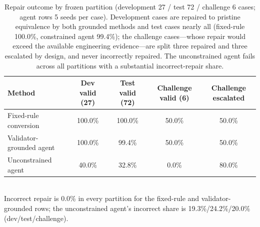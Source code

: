 \begin{table}[H]
\centering
\caption{Repair outcome by frozen partition (development 27 / test 72 /
challenge 6 cases; agent rows 5 seeds per case). Development cases are
repaired to pristine equivalence by both grounded methods and test cases
nearly all (fixed-rule 100.0\%, constrained agent 99.4\%); the challenge
cases---whose repair would exceed the available engineering evidence---are
split three repaired and three escalated by design, and never incorrectly
repaired. The unconstrained agent fails across all partitions with a
substantial incorrect-repair share.}
\label{tab:partition-repair}
\small
\begin{tabular}{p{}cccc}
\toprule
Method & Dev valid (27) & Test valid (72) & Challenge valid (6) &
Challenge escalated \\
\midrule
Fixed-rule conversion & 100.0\% & 100.0\% & 50.0\% & 50.0\% \\
Validator-grounded agent & 100.0\% & 99.4\% & 50.0\% & 50.0\% \\
Unconstrained agent & 40.0\% & 32.8\% & 0.0\% & 80.0\% \\
\bottomrule
\end{tabular}
\\[2pt]
{\footnotesize Incorrect repair is 0.0\% in every partition for the
fixed-rule and validator-grounded rows; the unconstrained agent's incorrect
share is 19.3\%/24.2\%/20.0\% (dev/test/challenge).}
\end{table}

\begin{table}[H]
\centering
\caption{Runtime resource use and task-level outcomes. Resource cells are
reported per composition mode on the held-out variant scenes (structural
metrics are exact; load time is the median of five cold opens and varies with
host). Peak memory stayed below the 1\,MB measurement threshold. Task stages
are measured with the frozen RL executor on the defect-free scene (the cell
reports the seed-42 partition; the seed-123 value is 84.0\%,
); planning, grasp, and alignment are not
instrumented
separately under the virtual-grasp scaffold (Section 7.3 of the main text).}
\label{tab:runtime-task}
\small
{}
\end{table}



